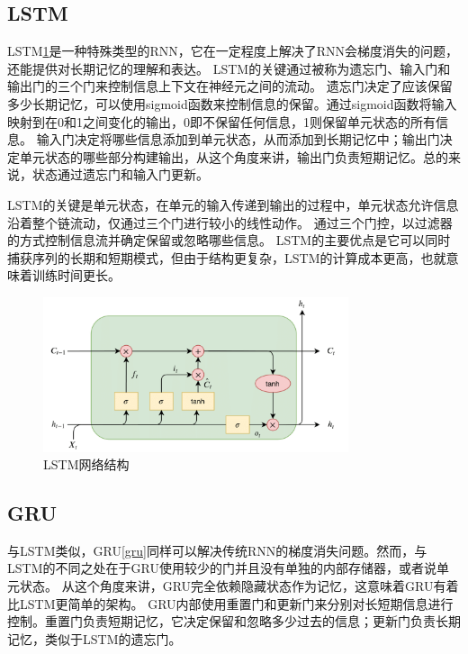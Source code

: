 \documentclass[]{ctexart}
\begin{document}
\subsection{LSTM}
LSTM\ref{lstm}是一种特殊类型的RNN，它在一定程度上解决了RNN会梯度消失的问题，还能提供对长期记忆的理解和表达。
LSTM的关键通过被称为遗忘门、输入门和输出门的三个门来控制信息上下文在神经元之间的流动。
遗忘门决定了应该保留多少长期记忆，可以使用sigmoid函数来控制信息的保留。通过sigmoid函数将输入映射到在0和1之间变化的输出，0即不保留任何信息，1则保留单元状态的所有信息。
输入门决定将哪些信息添加到单元状态，从而添加到长期记忆中；输出门决定单元状态的哪些部分构建输出，从这个角度来讲，输出门负责短期记忆。总的来说，状态通过遗忘门和输入门更新。

LSTM的关键是单元状态，在单元的输入传递到输出的过程中，单元状态允许信息沿着整个链流动，仅通过三个门进行较小的线性动作。
通过三个门控，以过滤器的方式控制信息流并确定保留或忽略哪些信息。
LSTM的主要优点是它可以同时捕获序列的长期和短期模式，但由于结构更复杂，LSTM的计算成本更高，也就意味着训练时间更长。
\begin{figure}[htb]
  \centering
  \includegraphics[width=0.8\textwidth]{asset/a_lstm.png}
  \caption{LSTM网络结构}
  \label{lstm}
\end{figure}

\subsection{GRU}
与LSTM类似，GRU\ref{gru}同样可以解决传统RNN的梯度消失问题。然而，与LSTM的不同之处在于GRU使用较少的门并且没有单独的内部存储器，或者说单元状态。
从这个角度来讲，GRU完全依赖隐藏状态作为记忆，这意味着GRU有着比LSTM更简单的架构。
GRU内部使用重置门和更新门来分别对长短期信息进行控制。重置门负责短期记忆，它决定保留和忽略多少过去的信息；更新门负责长期记忆，类似于LSTM的遗忘门。
\end{document}
